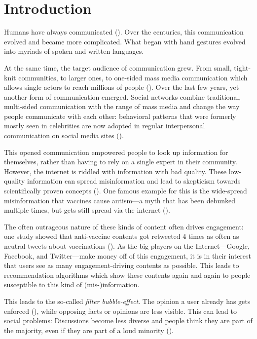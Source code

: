 \section{Introduction}
Humans have always communicated (\cite{tomasello2010origins}). Over the centuries, this communication evolved and became more complicated. What began with hand gestures evolved into myriads of spoken and written languages.

At the same time, the target audience of communication grew. From small, tight-knit communities, to larger ones, to one-sided mass media communication which allows single actors to reach millions of people (\cite{luhmann1995realitat}). Over the last few years, yet another form of communication emerged. Social networks combine traditional, multi-sided communication with the range of mass media and change the way people communicate with each other: behavioral patterns that were formerly mostly seen in celebrities are now adopted in regular interpersonal communication on social media sites (\cite{stefanoneRelationshipTraditionalMass2010}).

This opened communication empowered people to look up information for themselves, rather than having to rely on a single expert in their community. However, the internet is riddled with information with bad quality. These low-quality information can spread misinformation and lead to skepticism towards scientifically proven concepts (\cite{krimskyRiskCommunicationInternet2007}). One famous example for this is the wide-spread misinformation that vaccines cause autism---a myth that has been debunked multiple times, but gets still spread via the internet (\cite{baker2008mercury}).

The often outrageous nature of these kinds of content often drives engagement: one study showed that anti-vaccine contents got retweeted 4 times as often as neutral tweets about vaccinations (\cite{blankenshipSentimentContentsRetweets2018}). As the big players on the Internet---Google, Facebook, and Twitter---make money off of this engagement, it is in their interest that users see as many engagement-driving contents as possible. This leads to recommendation algorithms which show these contents again and again to people susceptible to this kind of (mis-)information.

This leads to the so-called \emph{filter bubble-effect}. The opinion a user already has gets enforced (\cite{pariser2011filter}), while opposing facts or opinions are less visible. This can lead to social problems: Discussions become less diverse and people think they are part of the majority, even if they are part of a loud minority (\cite{moscoviciSilentMajoritiesLoud1991}).

